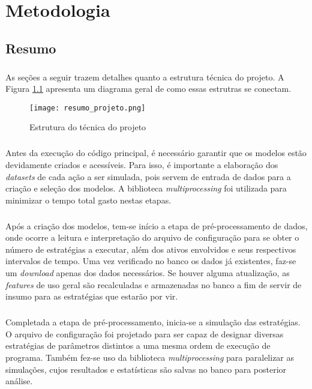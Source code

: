 \chapter{Metodologia}
\label{cap3}



\section{Resumo}

\paragraph{} As seções a seguir trazem detalhes quanto a estrutura técnica do projeto. A Figura \ref{fig:100} apresenta um diagrama geral de como essas estrutras se conectam.

\begin{figure}[h]
    \texttt{[image: resumo\_projeto.png]}
    \centering
    \caption{Estrutura do técnica do projeto}
    \label{fig:100}
\end{figure}

\paragraph{} Antes da execução do código principal, é necessário garantir que os modelos estão devidamente criados e acessíveis. Para isso, é importante a elaboração dos \textit{datasets} de cada ação a ser simulada, pois servem de entrada de dados para a criação e seleção dos modelos. A biblioteca \textit{multiprocessing} foi utilizada para minimizar o tempo total gasto nestas etapas.

\paragraph{} Após a criação dos modelos, tem-se início a etapa de pré-processamento de dados, onde ocorre a leitura e interpretação do arquivo de configuração para se obter o número de estratégias a executar, além dos ativos envolvidos e seus respectivos intervalos de tempo. Uma vez verificado no banco os dados já existentes, faz-se um \textit{download} apenas dos dados necessários. Se houver alguma atualização, as \textit{features} de uso geral são recalculadas e armazenadas no banco a fim de servir de insumo para as estratégias que estarão por vir.

\paragraph{} Completada a etapa de pré-processamento, inicia-se a simulação das estratégias. O arquivo de configuração foi projetado para ser capaz de designar diversas estratégias de parâmetros distintos a uma mesma ordem de execução de programa. Também fez-se uso da biblioteca \textit{multiprocessing} para paralelizar as simulações, cujos resultados e estatísticas são salvas no banco para posterior análise.


